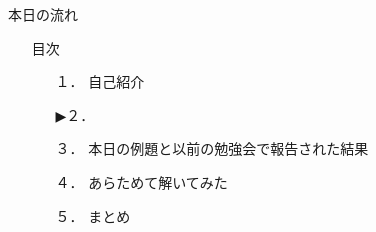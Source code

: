 \begin{frame}{本日の流れ}
  \begin{itemize}
      \item[] 目次
      \begin{itemize}[itemsep=1.3ex, leftmargin=1cm]
        \item[１．]  {\color{cud_lightgray} 自己紹介}
        \item[▶２．] 
        \item[３．] 本日の例題と以前の勉強会で報告された結果
        \item[４．] あらためて解いてみた
        \item[５．] まとめ
     \end{itemize}
  \end{itemize}
\end{frame}
